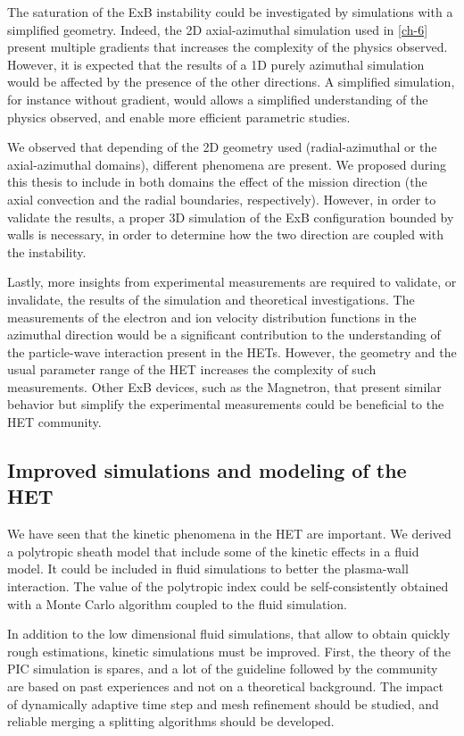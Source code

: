 The saturation of the ExB instability could be investigated by simulations with a simplified geometry.
Indeed, the 2D axial-azimuthal simulation used in \cref{ch-6} present multiple gradients that increases the complexity of the physics observed.
However, it is expected that the results of a 1D purely azimuthal simulation would be affected by the presence of the other directions.
A simplified simulation, for instance without gradient, would allows a simplified understanding of the physics observed, and enable more efficient parametric studies.

We observed that depending of the 2D geometry used (radial-azimuthal or the axial-azimuthal domains), different phenomena are present.
We proposed during this thesis to include in both domains the effect of the mission direction (the axial convection and the radial boundaries, respectively).
However, in order to validate the results, a proper 3D simulation of the ExB configuration bounded by walls is necessary, in order to determine how the two direction are coupled with the instability.

Lastly, more insights from experimental measurements are required to validate, or invalidate, the results of the simulation and theoretical investigations.
The measurements of the electron and ion velocity distribution functions in the azimuthal direction would be a significant contribution to the understanding of the particle-wave interaction present in the HETs.
However, the geometry and the usual parameter range of the HET increases the complexity of such measurements.
Other ExB devices, such as the Magnetron, that present similar behavior but simplify the experimental measurements could be beneficial to the HET community.

\subsection{Improved simulations and modeling of the HET}

We have seen that the kinetic phenomena in the HET are important.
We derived a polytropic sheath model that include some of the kinetic effects in a fluid model.
It could be included in fluid simulations to better the plasma-wall interaction.
The value of the polytropic index could be self-consistently obtained with a Monte Carlo algorithm coupled to the fluid simulation.

In addition to the low dimensional fluid simulations, that allow to obtain quickly rough estimations, kinetic simulations must be improved.
First, the theory of the PIC simulation is spares, and a lot of the guideline followed by the community are based on past experiences and not on a theoretical background.
The impact of dynamically adaptive time step and mesh refinement should be studied, and reliable merging a splitting algorithms should be developed.

